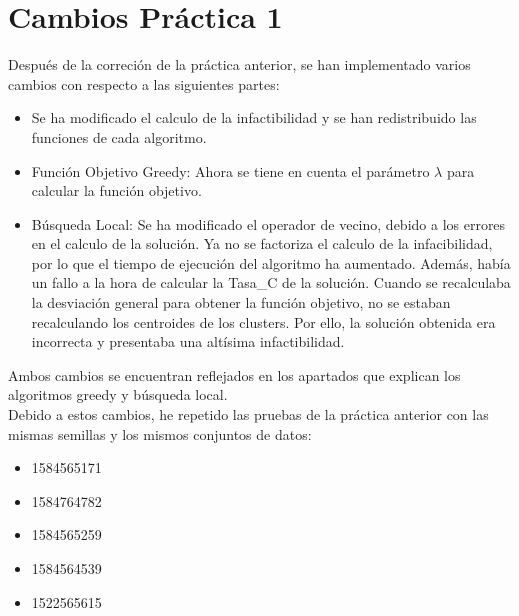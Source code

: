 \newpage
\section{Cambios Práctica 1}
Después de la correción de la práctica anterior, se han implementado varios cambios con respecto a las siguientes partes:

\begin{itemize}
   \item Se ha modificado el calculo de la infactibilidad y se han redistribuido las funciones de cada algoritmo.
   \item Función Objetivo Greedy: Ahora se tiene en cuenta el parámetro $ \lambda $ para calcular la función objetivo.
   \item Búsqueda Local: Se ha modificado el operador de vecino, debido a los errores en el calculo de la solución. Ya no se factoriza el calculo de la infacibilidad, por lo que el tiempo de ejecución del algoritmo ha aumentado. Además, había un fallo a la hora de calcular la Tasa\_C de la solución. Cuando se recalculaba la desviación general para obtener la función objetivo, no se estaban recalculando los centroides de los clusters. Por ello, la solución obtenida era incorrecta y presentaba una altísima infactibilidad.
\end{itemize}
Ambos cambios se encuentran reflejados en los apartados que explican los algoritmos greedy y búsqueda local.\\
Debido a estos cambios, he repetido las pruebas de la práctica anterior con las mismas semillas y los mismos conjuntos de datos:
\begin{itemize}
   \item 1584565171
   \item 1584764782
   \item 1584565259
   \item 1584564539
   \item 1522565615
\end{itemize}

